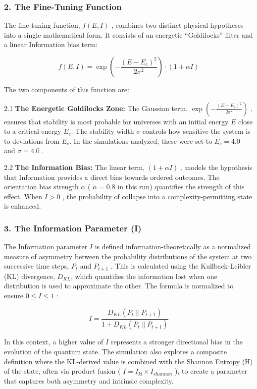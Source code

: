 \subsubsection{2. The Fine-Tuning
Function}\label{the-fine-tuning-function}

The fine-tuning function, \(f(E,I)\) , combines two distinct physical
hypotheses into a single mathematical form. It consists of an energetic
``Goldilocks'' filter and a linear Information bias term:

\[
f(E,I) = \exp\left(-\frac{(E-E_c)^2}{2\sigma^2}\right) \cdot (1+\alpha I)
\]

The two components of this function are:

2.1 \textbf{The Energetic Goldilocks Zone:} The Gaussian term,
\(\exp\left(-\frac{(E-E_c)^2}{2\sigma^2}\right)\) , ensures that
stability is most probable for universes with an initial energy \(E\)
close to a critical energy \(E_c\). The stability width \(\sigma\)
controls how sensitive the system is to deviations from \(E_c\). In the
simulations analyzed, these were set to \(E_c = 4.0\) and
\(\sigma = 4.0\) .

2.2 \textbf{The Information Bias:} The linear term, \((1 + \alpha I)\) ,
models the hypothesis that Information provides a direct bias towards
ordered outcomes. The orientation bias strength \(\alpha\) (
\(\alpha = 0.8\) in this run) quantifies the strength of this effect.
When \(I > 0\) , the probability of collapse into a
complexity-permitting state is enhanced.

\subsubsection{3. The Information Parameter
(I)}\label{the-information-parameter-i}

The Information parameter \(I\) is defined information-theoretically as
a normalized measure of asymmetry between the probability distributions
of the system at two successive time steps, \(P_t\) and \(P_{t+1}\) .
This is calculated using the Kullback-Leibler (KL) divergence,
\(D_{KL}\), which quantifies the information lost when one distribution
is used to approximate the other. The formula is normalized to ensure
\(0 \le I \le 1\) :

\[
I = \frac{D_{KL}(P_t \parallel P_{t+1})}{1 + D_{KL}(P_t \parallel P_{t+1})}
\]

In this context, a higher value of \(I\) represents a stronger
directional bias in the evolution of the quantum state. The simulation
also explores a composite definition where the KL-derived value is
combined with the Shannon Entropy (H) of the state, often via product
fusion ( \(I = I_{kl} \times I_{shannon}\) ), to create a parameter that
captures both asymmetry and intrinsic complexity.

